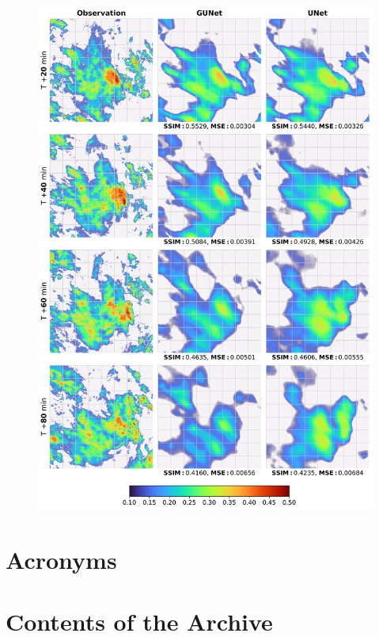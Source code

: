 \begin{figure}[ht]
    \centering
    \includegraphics[width=\textwidth]{images/comparison_square_04.png}
    \caption[Comparison of weather predictions of both models (5)]{\label{fig:comparison_04}}
\end{figure}

\chapter{Acronyms}
\renewcommand{\glossarysection}[2][]{}
\printglossaries

\chapter{Contents of the Archive}

